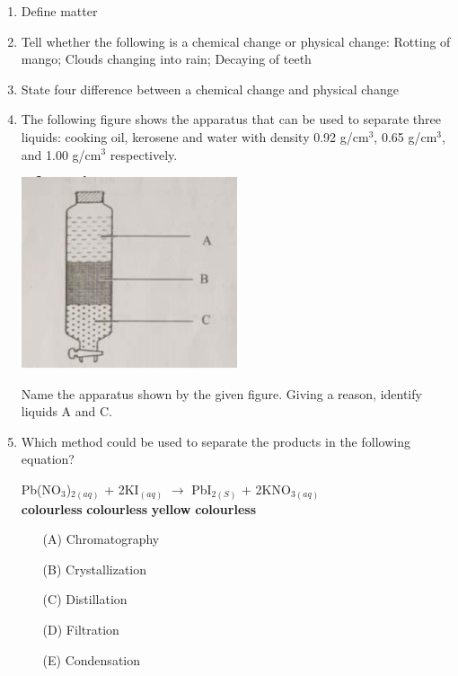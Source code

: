\begin{enumerate}
	\item Define matter
	
	\item Tell whether the following is a chemical change or physical change: Rotting of mango; Clouds changing into rain; Decaying of teeth
	
	\item State four difference between a chemical change and physical change
	
	\item The following figure shows the apparatus that can be used to separate three liquids: cooking oil, kerosene and water with density 0.92 g/cm$^3$, 0.65 g/cm$^3$, and 1.00 g/cm$^3$ respectively. \\
	\begin{center}
		\includegraphics[width=0.5\textwidth]{./img/chem_I_matter_2.png}
	\end{center}
	Name the apparatus shown by the given figure. Giving a reason, identify liquids A and C. 
	
	\item Which method could be used to separate the products in the following equation? 
	\begin{center}
	Pb(NO$_3$)$_{2 (aq)}$ + 2KI$_{(aq)}$ $\rightarrow$ PbI$_{2 (S)}$ + 2KNO$_{3 (aq)}$ \\
	\textbf{colourless} \hspace*{2mm} \textbf{colourless} \hspace*{2mm} \textbf{yellow} \hspace*{2mm} \textbf{colourless}
	\end{center}
	\begin{enumerate}[topsep=0ex,itemsep=0ex,partopsep=1ex,parsep=1ex]
		\item[(A)] Chromatography
		\item[(B)] Crystallization
		\item[(C)] Distillation
		\item[(D)] Filtration
		\item[(E)] Condensation
	\end{enumerate}
	

\end{enumerate}

